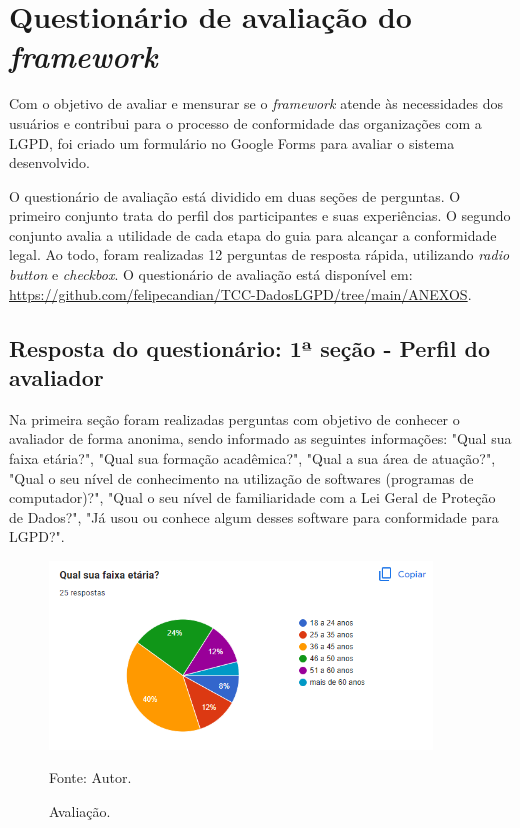 \documentclass[
	12pt,				%
	openright,			%
	oneside,			%
	a4paper,			%
	english,			%
	french,				%
	spanish,			%
	brazil,				%
	]{abntex2}
\begin{document}
\section{Questionário de avaliação do \textit{framework} }

Com o objetivo de avaliar e mensurar se o \textit{framework} atende às necessidades dos usuários e contribui para o processo de conformidade das organizações com a LGPD, foi criado um formulário no Google Forms para avaliar o sistema desenvolvido.

O questionário de avaliação está dividido em duas seções de perguntas. O primeiro conjunto trata do perfil dos participantes e suas experiências. O segundo conjunto avalia a utilidade de cada etapa do guia para alcançar a conformidade legal. Ao todo, foram realizadas 12 perguntas de resposta rápida, utilizando \textit{radio button }e \textit{checkbox}. O questionário de avaliação está disponível em: \url{https://github.com/felipecandian/TCC-DadosLGPD/tree/main/ANEXOS}.

 
 \subsection{Resposta do questionário: 1ª seção - Perfil do avaliador}
 Na primeira seção foram realizadas perguntas com objetivo de conhecer o avaliador de forma anonima, sendo informado as seguintes informações: "Qual sua faixa etária?", "Qual sua formação acadêmica?", "Qual a sua área de atuação?", "Qual o seu nível de conhecimento na utilização de softwares (programas de computador)?", "Qual o seu nível de familiaridade com a Lei Geral de Proteção de Dados?", "Já usou ou conhece algum desses software para conformidade para LGPD?".
\pagebreak
 
\label{sec: resultados}

\begin{figure}[ht]
    \centering
    \caption{Avaliação.}
    \includegraphics[width=4.0in]{Images/questionario/1.png}
    \label{fig: grafico-acc}
    
    \centering \small Fonte: Autor.
\end{figure}
\end{document}
